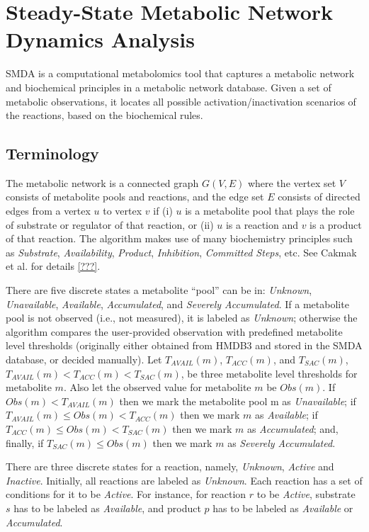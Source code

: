 \section{Steady-State Metabolic Network Dynamics Analysis}
\label{sect:smda}

SMDA is a computational metabolomics tool that captures a metabolic network and
biochemical principles in a metabolic network database. Given a set of metabolic
observations, it locates all possible activation/inactivation scenarios of the
reactions, based on the biochemical rules.

\subsection{Terminology}
\label{sect:smda_terminology}

The metabolic network is a connected graph $G(V,E)$ where the vertex set $V$
consists of metabolite pools and reactions, and the edge set $E$ consists of
directed edges from a vertex $u$ to vertex $v$ if (i) $u$ is a metabolite pool
that plays the role of substrate or regulator of that reaction, or (ii) $u$ is a
reaction and $v$ is a product of that reaction. The algorithm makes use of many
biochemistry principles such as \emph{Substrate}, \emph{Availability},
\emph{Product}, \emph{Inhibition}, \emph{Committed Steps}, etc. See Cakmak et
al. for details \ref{???}.

There are five discrete states a metabolite “pool” can be in: \emph{Unknown},
\emph{Unavailable}, \emph{Available}, \emph{Accumulated}, and \emph{Severely
Accumulated}. If a metabolite pool is not observed (i.e., not measured), it is
labeled as \emph{Unknown}; otherwise the algorithm compares the user-provided
observation with predefined metabolite level thresholds (originally either
obtained from HMDB3 and stored in the SMDA database, or decided manually). Let
$T_{AVAIL} (m)$, $T_{ACC} (m)$, and $T_{SAC} (m)$, $T_{AVAIL} (m) < T_{ACC} (m)
< T_{SAC} (m)$, be three metabolite level thresholds for metabolite $m$. Also
let the observed value for metabolite $m$ be $Obs(m)$. If $Obs(m) < T_{AVAIL}
(m)$ then we mark the metabolite pool m as \emph{Unavailable}; if $T_{AVAIL} (m)
\leq Obs(m) < T_{ACC}(m)$ then we mark $m$ as \emph{Available}; if $T_{ACC} (m)
\leq Obs(m) < T_{SAC} (m)$ then we mark $m$ as \emph{Accumulated}; and, finally,
if $T_{SAC}(m) \leq Obs(m)$ then we mark $m$ as \emph{Severely Accumulated}.

There are three discrete states for a reaction, namely, \emph{Unknown},
\emph{Active} and \emph{Inactive}. Initially, all reactions are labeled as
\emph{Unknown}.  Each reaction has a set of conditions for it to be
\emph{Active}. For instance, for reaction $r$ to be \emph{Active}, substrate $s$
has to be labeled as \emph{Available}, and product $p$ has to be labeled as
\emph{Available} or \emph{Accumulated}.

